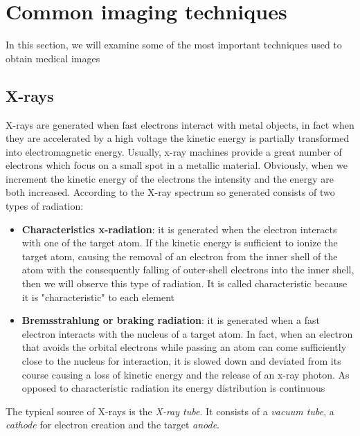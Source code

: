 \section{Common imaging techniques}\label{sec13:imageTechniques}
In this section, we will examine some of the most important techniques used to obtain medical images

\subsection{X-rays}

X-rays are generated when fast electrons interact with metal objects, in fact when they are accelerated by a high voltage the kinetic energy is partially transformed into electromagnetic energy. Usually, x-ray machines provide a great number of electrons which focus on a small spot in a metallic material. Obviously, when we increment the kinetic energy of the electrons the intensity and the energy are both increased. According to \cite{Birkfellner} the X-ray spectrum so generated consists of two types of radiation:
\begin{itemize}
 \item \textbf{Characteristics x-radiation}: it is generated when the electron interacts with one of the target atom. If the kinetic energy is sufficient to ionize the target atom, causing the removal of an electron from the inner shell of the atom with the consequently falling of outer-shell electrons into the inner shell, then we will observe this type of radiation. It is called characteristic because it is "characteristic" to each element
 \item \textbf{Bremsstrahlung or braking radiation}: it is generated when a fast electron interacts with the nucleus of a target atom. In fact, when an electron that avoids the orbital electrons while passing an atom can come sufficiently close to the nucleus for interaction, it is slowed down and deviated from its course causing a loss of kinetic energy and the release of an x-ray photon. As opposed to characteristic radiation its energy distribution is continuous
\end{itemize}

The typical source of X-rays is the \textit{X-ray tube}. It consists of a \textit{vacuum tube}, a \textit{cathode} for electron creation and the target \textit{anode}.

